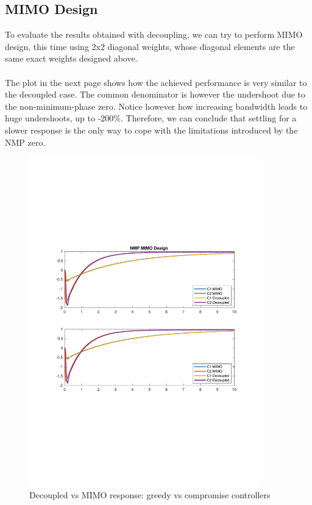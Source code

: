 \documentclass[a4paper, 12pt]{article}
\def\FigureFifteen{\centering\includegraphics[width=0.9\textwidth]{Figures/fig15.pdf}}
\begin{document}
\subsection{MIMO Design}
To evaluate the results obtained with decoupling, we can try to perform MIMO design, this time using 2x2 diagonal weights, whose diagonal elements are the same exact weights designed above.
\\\\
The plot in the next page shows how the achieved performance is very similar to the decoupled case. The common denominator is however the undershoot due to the non-minimum-phase zero. Notice however how increasing bandwidth leads to huge undershoots, up to -200\%. Therefore, we can conclude that settling for a slower response is the only way to cope with the limitations introduced by the NMP zero.
\begin{figure}[h!]
    \FigureFifteen
    \caption{Decoupled vs MIMO response: greedy vs compromise controllers}
    \label{fig:fig15}
\end{figure}
\end{document}

